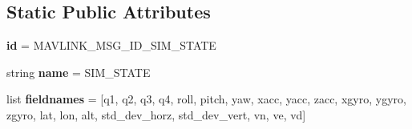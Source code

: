 \subsection*{Static Public Attributes}
\begin{DoxyCompactItemize}
\item 
\mbox{\label{classpymavlink_1_1dialects_1_1v10_1_1MAVLink__sim__state__message_acd9d7d3dc4b907d598b241ac114a404d}} 
{\bfseries id} = M\+A\+V\+L\+I\+N\+K\+\_\+\+M\+S\+G\+\_\+\+I\+D\+\_\+\+S\+I\+M\+\_\+\+S\+T\+A\+TE
\item 
\mbox{\label{classpymavlink_1_1dialects_1_1v10_1_1MAVLink__sim__state__message_abd4b94b82c429d8e62815e7e8060f918}} 
string {\bfseries name} = \textquotesingle{}S\+I\+M\+\_\+\+S\+T\+A\+TE\textquotesingle{}
\item 
\mbox{\label{classpymavlink_1_1dialects_1_1v10_1_1MAVLink__sim__state__message_afc2ac30c892edac8c24c8d369642dc0e}} 
list {\bfseries fieldnames} = \mbox{[}\textquotesingle{}q1\textquotesingle{}, \textquotesingle{}q2\textquotesingle{}, \textquotesingle{}q3\textquotesingle{}, \textquotesingle{}q4\textquotesingle{}, \textquotesingle{}roll\textquotesingle{}, \textquotesingle{}pitch\textquotesingle{}, \textquotesingle{}yaw\textquotesingle{}, \textquotesingle{}xacc\textquotesingle{}, \textquotesingle{}yacc\textquotesingle{}, \textquotesingle{}zacc\textquotesingle{}, \textquotesingle{}xgyro\textquotesingle{}, \textquotesingle{}ygyro\textquotesingle{}, \textquotesingle{}zgyro\textquotesingle{}, \textquotesingle{}lat\textquotesingle{}, \textquotesingle{}lon\textquotesingle{}, \textquotesingle{}alt\textquotesingle{}, \textquotesingle{}std\+\_\+dev\+\_\+horz\textquotesingle{}, \textquotesingle{}std\+\_\+dev\+\_\+vert\textquotesingle{}, \textquotesingle{}vn\textquotesingle{}, \textquotesingle{}ve\textquotesingle{}, \textquotesingle{}vd\textquotesingle{}\mbox{]}
\item 
\mbox{\label{classpymavlink_1_1dialects_1_1v10_1_1MAVLink__sim__state__message_a4d52000b4d595e99cbdedfe2bf086133}} 

\end{DoxyCompactItemize}

